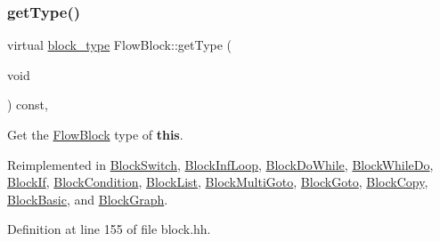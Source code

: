 \subsubsection{\texorpdfstring{getType()}{getType()}}
{\footnotesize\ttfamily virtual \mbox{\hyperlink{class_flow_block_a70df78390870fcdd51e31426ba6a193e}{block\+\_\+type}} Flow\+Block\+::get\+Type (\begin{DoxyParamCaption}\item[{void}]{ }\end{DoxyParamCaption}) const\hspace{0.3cm}{\ttfamily [inline]}, {\ttfamily [virtual]}}



Get the \mbox{\hyperlink{class_flow_block}{Flow\+Block}} type of {\bfseries{this}}. 



Reimplemented in \mbox{\hyperlink{class_block_switch_a9796f852aa205ba32346ae9d249f94c1}{Block\+Switch}}, \mbox{\hyperlink{class_block_inf_loop_a798896823e2c790567144b525753eca7}{Block\+Inf\+Loop}}, \mbox{\hyperlink{class_block_do_while_a3700fcac8afffc121249a49af054269e}{Block\+Do\+While}}, \mbox{\hyperlink{class_block_while_do_a7bb1454de32707fac664051525c58d47}{Block\+While\+Do}}, \mbox{\hyperlink{class_block_if_a6fb92878f6e42112610ac0dee44c63a9}{Block\+If}}, \mbox{\hyperlink{class_block_condition_a654b72b19819b68c6f09e507dfee4ddd}{Block\+Condition}}, \mbox{\hyperlink{class_block_list_ab77ac8f833192e59773b7e3829823dc5}{Block\+List}}, \mbox{\hyperlink{class_block_multi_goto_a9fd5bfdaa3202a1cd604213c2be88bf2}{Block\+Multi\+Goto}}, \mbox{\hyperlink{class_block_goto_a11f324c0fdd3849a53250a0d67b6c94e}{Block\+Goto}}, \mbox{\hyperlink{class_block_copy_aab8dda53eba113d624cbd3b22b0c58c1}{Block\+Copy}}, \mbox{\hyperlink{class_block_basic_aeb3a61f4e372495d0644f56c5c20f974}{Block\+Basic}}, and \mbox{\hyperlink{class_block_graph_a8e542e109e0acc977218ceaf3c248153}{Block\+Graph}}.



Definition at line 155 of file block.\+hh.

